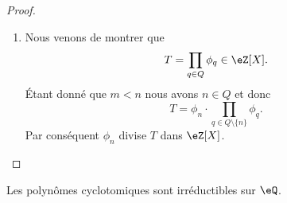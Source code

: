 \begin{proof}
\begin{enumerate}
        \item

            Nous venons de montrer que
            \begin{equation}
                T=\prod_{q\in Q}\phi_q\in \eZ[X].
            \end{equation}
            Étant donné que \( m<n\) nous avons \( n\in Q\) et donc
            \begin{equation}
                T=\phi_n\cdot\prod_{q\in Q\setminus\{ n \}}\phi_q.
            \end{equation}
            Par conséquent \( \phi_n\) divise \( T\) dans \( \eZ[X]\).
        \end{enumerate}
\end{proof}

\begin{proposition} \label{PropoIeOVh}
    Les polynômes cyclotomiques sont irréductibles sur \( \eQ\).
\end{proposition}


